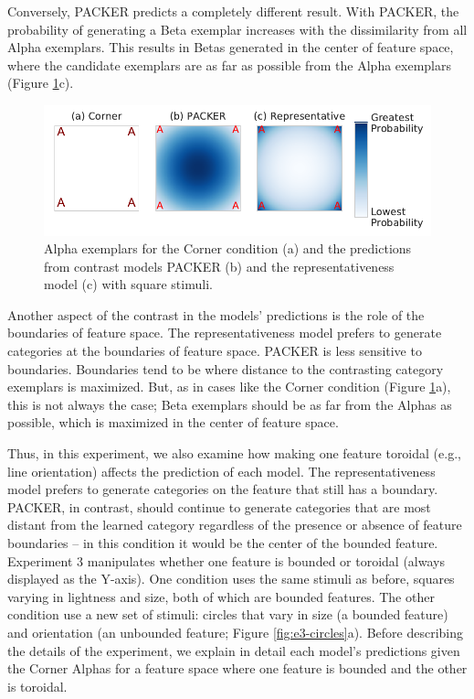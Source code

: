 \documentclass[pdflatex,sn-apa]{sn-jnl}%
\theoremstyle{thmstyleone}%
\theoremstyle{thmstyletwo}%
\theoremstyle{thmstylethree}%
\begin{document}
Conversely, PACKER predicts a completely different result. With PACKER, the probability of generating a Beta exemplar
increases with the dissimilarity from all Alpha exemplars. This results in Betas generated in the center of feature
space, where the candidate exemplars are as far as possible from the Alpha exemplars (Figure \ref{fig:e3-squares}c).

\begin{figure}[p]
    \begin{center} 
      \includegraphics[width=.8\textwidth]{figs/e3-squares.pdf}
      \caption{Alpha exemplars for the Corner condition (a) and the predictions
        from contrast models PACKER (b) and the representativeness model (c)
        with square stimuli.}
      \label{fig:e3-squares}
    \end{center}
\end{figure}

Another aspect of the contrast in the models' predictions is the role of the boundaries of feature space. The
representativeness model prefers to generate categories at the boundaries of feature space. PACKER is less sensitive to
boundaries. Boundaries tend to be where distance to the contrasting category exemplars is maximized. But, as in cases
like the Corner condition (Figure \ref{fig:e3-squares}a), this is not always the case; Beta exemplars should be as far
from the Alphas as possible, which is maximized in the center of feature space. 

Thus, in this experiment, we also examine how making one feature toroidal (e.g.,
line orientation) affects the prediction of each model. The representativeness
model prefers to generate categories on the feature that still has a boundary.
PACKER, in contrast, should continue to generate categories that are most
distant from the learned category regardless of the presence or absence of feature
boundaries -- in this condition it would be the center of the bounded feature.
Experiment 3 manipulates whether one feature is bounded or toroidal (always
displayed as the Y-axis). One condition uses the same stimuli as before, squares
varying in lightness and size, both of which are bounded features. The other
condition use a new set of stimuli: circles that vary in size (a bounded
feature) and orientation (an unbounded feature; Figure \ref{fig:e3-circles}a).
Before describing the details of the experiment, we explain in detail each
model's predictions given the Corner Alphas for a feature space where one
feature is bounded and the other is toroidal.
\end{document}
